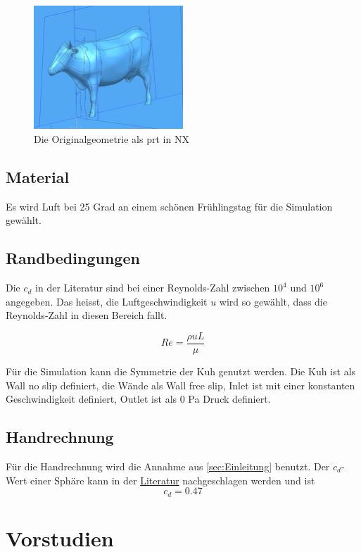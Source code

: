 \documentclass[a4paper,12pt]{article}
\begin{document}
\begin{figure}[h]
    \centering
    \includegraphics[width=0.5\textwidth]{nx.PNG}
    \caption{Die Originalgeometrie als prt in NX}
    \label{fig:nx}
\end{figure}

\newpage
\subsection{Material}
Es wird Luft bei 25 Grad an einem schönen Frühlingstag für die Simulation gewählt.

\subsection{Randbedingungen}
Die \( c_d \) in der Literatur sind bei einer Reynolds-Zahl zwischen \( 10^4 \) und \( 10^6 \) angegeben. Das heisst, die Luftgeschwindigkeit \( u \) wird so gewählt, dass die Reynolds-Zahl in diesen Bereich fallt.

\begin{equation}
Re = \frac{\rho u L}{\mu}
\end{equation}

Für die Simulation kann die Symmetrie der Kuh genutzt werden. Die Kuh ist als Wall no slip definiert, die Wände als Wall free slip, Inlet ist mit einer konstanten Geschwindigkeit definiert, Outlet ist als 0 Pa Druck definiert.

\subsection{Handrechnung}\label{sec:handrechnung}
Für die Handrechnung wird die Annahme aus \ref{sec:Einleitung} benutzt. Der \( c_d \)-Wert einer Sphäre kann in der \href{https://en.wikipedia.org/wiki/Drag_coefficient}{Literatur} nachgeschlagen werden und ist
$$c_d = 0.47$$

\section{Vorstudien}
\end{document}
